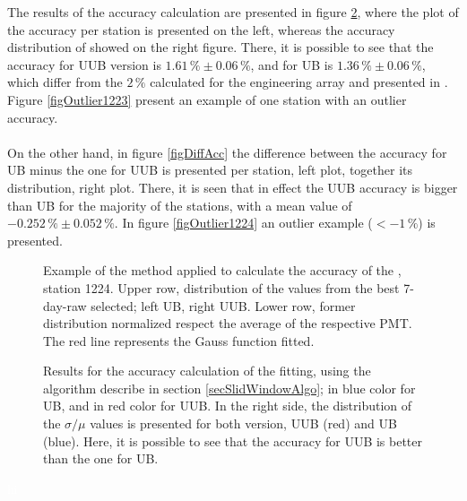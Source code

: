 \documentclass[twoside, final, 10pt]{articleMine}
\begin{document}
The results of the \qpkvem accuracy calculation are presented in
figure \ref{figAccuracyResults}, where the plot of the accuracy
per station is presented on the left, whereas the accuracy
distribution of showed on the right figure. There, it is possible
to see that the accuracy for UUB version is
$1.61\,\%\pm0.06\,\%$, and for UB is $1.36\,\%\pm0.06\,\%$, which
differ from the $2\,\%$ calculated for the engineering array and
presented in \cite{gap2002-046}. Figure \ref{figOutlier1223}
present an example of one station with an outlier accuracy.\\\\On
the other hand, in figure \ref{figDiffAcc} the difference between
the accuracy for UB minus the one for UUB is presented per
station, left plot, together its distribution, right plot. There,
it is seen that in effect the UUB accuracy is bigger than UB for
the majority of the stations, with a mean value of
$-0.252\,\%\pm0.052\,\%$. In figure \ref{figOutlier1224} an
outlier example ($<-1\,\%$) is presented.

\clearpage

\begin{figure}[!t]
  \label{figQpkNormalizedSt1224}
  \centering
  \caption{Example of the method applied to calculate the
  accuracy of the \qpkvem, station 1224. Upper row, distribution
  of the \qpkvem values from the best 7-day-raw selected; left
  UB, right UUB. Lower row, former distribution normalized
  respect the average of the respective PMT. The red line
  represents the Gauss function fitted.}
  \label{figQpkNormalizedSt1224}
\end{figure}

\begin{figure}[!t]
  \label{figAccuracyResults}
  \centering
  \caption{Results for the accuracy calculation of the \qpkvem
  fitting, using the algorithm describe in section 
  \ref{secSlidWindowAlgo}; in blue color for UB, and in red color
  for UUB. In the right side, the distribution of the
  $\sigma/\mu$ values is presented for both version, UUB (red)
  and UB (blue). Here, it is possible to see that the accuracy
  for UUB is better than the one for UB.}
  \label{figAccuracyResults}
\end{figure}
\textcolor{white}{hi}
\clearpage
\end{document}
